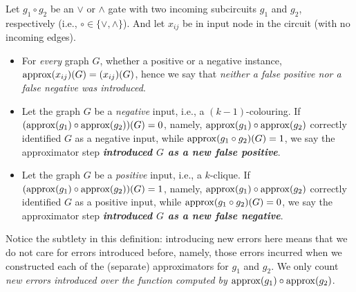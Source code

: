 

\begin{definition}\label{def:new-errors}
Let $g_1\circ g_2$ be an $\lor$ or $\land$ gate with two incoming subcircuits $g_1$ and $g_2$, respectively (i.e., $\circ\in\{\lor,\land\}$). And let $x_{ij}$ be in input node in the circuit (with no incoming edges).
\begin{itemize}
\item 
For \emph{every} graph $G$, whether a positive or a  negative instance, 
${\rm approx}(x_{ij})(G)=(x_{ij})(G)$, hence we say that \emph{neither a false positive nor a false negative was introduced}.  
 
\item 
Let the graph $G$ be a \emph{negative} input, i.e., a $(k-1)$-colouring. If $({\rm approx}(g_1)\circ {\rm approx}(g_2))(G)=0$, namely, ${\rm approx}(g_1)\circ {\rm approx}(g_2)$ correctly identified $G$ as a negative input, 
while ${\rm approx}(g_1\circ g_2)(G)=1$, we say the approximator 
step \emph{\textbf{introduced $G$ as a new false positive}}. 

\item Let the graph $G$ be a \emph{positive} input, i.e., a $k$-clique. If $({\rm approx}(g_1) \circ {\rm approx}(g_2))(G)=1$, namely, ${\rm approx}(g_1)\circ {\rm approx}(g_2)$ correctly identified $G$ as a positive input, while 
${\rm approx}(g_1\circ g_2)(G)=0$, we say the approximator 
step \textbf{\emph{introduced $G$ as a new false negative}}.
\end{itemize}
\end{definition}

Notice the  subtlety in this definition: introducing new errors here means that we do not care for errors introduced before, namely, those errors incurred  when we constructed each of the (separate) approximators for $g_1$ and $g_2$. We only count \emph{new errors introduced over the function computed by ${\rm approx}(g_1)\circ {\rm approx}(g_2)$}.







